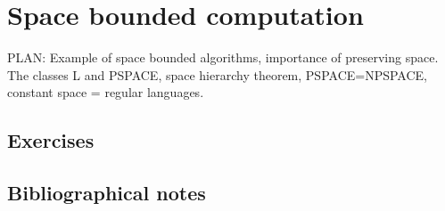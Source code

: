 \chapter{Space bounded computation}\label{spacechap}

PLAN: Example of space bounded algorithms, importance of preserving
space. The classes L and PSPACE, space hierarchy theorem,
PSPACE=NPSPACE, constant space = regular languages.

\section{Exercises}\label{Exercises}

\section{Bibliographical notes}\label{Bibliographical-notes}
